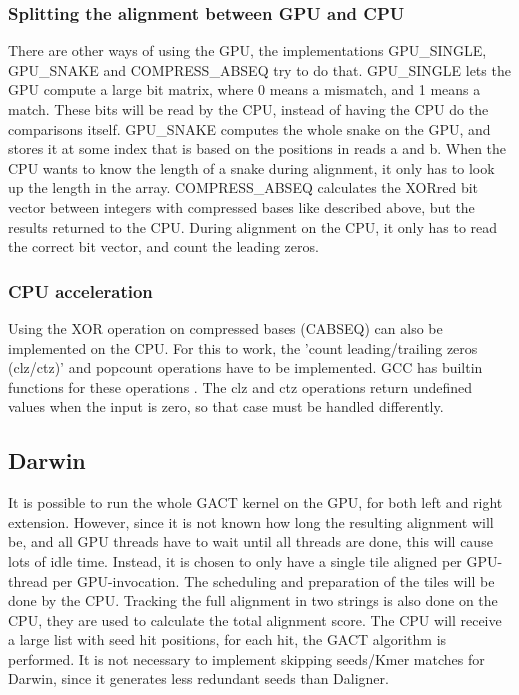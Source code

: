 \documentclass[../thesis.tex]{subfiles}
\begin{document}
\subsubsection{Splitting the alignment between GPU and CPU}
There are other ways of using the GPU, the implementations GPU\_SINGLE, GPU\_SNAKE and COMPRESS\_ABSEQ try to do that.
GPU\_SINGLE lets the GPU compute a large bit matrix, where 0 means a mismatch, and 1 means a match.
These bits will be read by the CPU, instead of having the CPU do the comparisons itself.
GPU\_SNAKE computes the whole snake on the GPU, and stores it at some index that is based on the positions in reads a and b.
When the CPU wants to know the length of a snake during alignment, it only has to look up the length in the array.
COMPRESS\_ABSEQ calculates the XORred bit vector between integers with compressed bases like described above, but the results returned to the CPU.
During alignment on the CPU, it only has to read the correct bit vector, and count the leading zeros.


\subsubsection{CPU acceleration}
Using the XOR operation on compressed bases (CABSEQ) can also be implemented on the CPU.
For this to work, the 'count leading/trailing zeros (clz/ctz)' and popcount operations have to be implemented.
GCC has builtin functions for these operations \cite{GCC}.
The clz and ctz operations return undefined values when the input is zero, so that case must be handled differently.


\subsection{Darwin}
It is possible to run the whole GACT kernel on the GPU, for both left and right extension.
However, since it is not known how long the resulting alignment will be, and all GPU threads have to wait until all threads are done, this will cause lots of idle time.
Instead, it is chosen to only have a single tile aligned per GPU-thread per GPU-invocation.
The scheduling and preparation of the tiles will be done by the CPU.
Tracking the full alignment in two strings is also done on the CPU, they are used to calculate the total alignment score.
The CPU will receive a large list with seed hit positions, for each hit, the GACT algorithm is performed.
It is not necessary to implement skipping seeds/Kmer matches for Darwin, since it generates less redundant seeds than Daligner.
\end{document}
